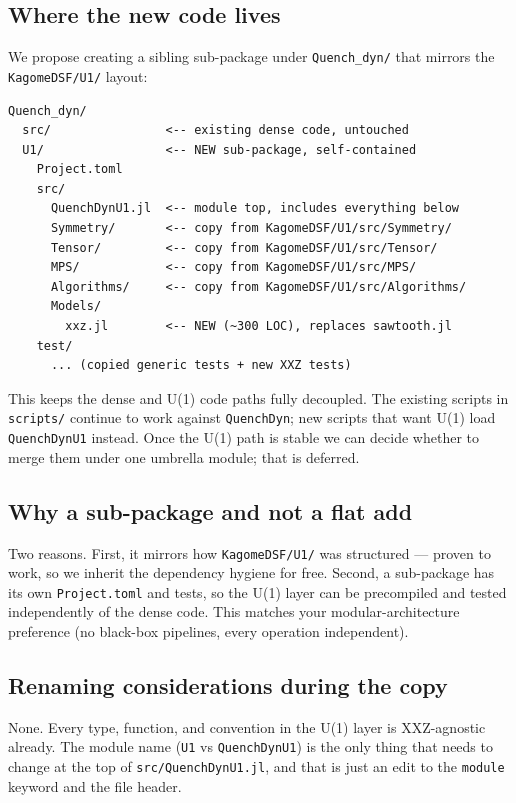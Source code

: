 \documentclass[11pt]{article}
\begin{document}
\subsection{Where the new code lives}
We propose creating a sibling sub-package under \texttt{Quench\_dyn/} that
mirrors the \texttt{KagomeDSF/U1/} layout:
\begin{verbatim}
Quench_dyn/
  src/                <-- existing dense code, untouched
  U1/                 <-- NEW sub-package, self-contained
    Project.toml
    src/
      QuenchDynU1.jl  <-- module top, includes everything below
      Symmetry/       <-- copy from KagomeDSF/U1/src/Symmetry/
      Tensor/         <-- copy from KagomeDSF/U1/src/Tensor/
      MPS/            <-- copy from KagomeDSF/U1/src/MPS/
      Algorithms/     <-- copy from KagomeDSF/U1/src/Algorithms/
      Models/
        xxz.jl        <-- NEW (~300 LOC), replaces sawtooth.jl
    test/
      ... (copied generic tests + new XXZ tests)
\end{verbatim}
This keeps the dense and U(1) code paths fully decoupled.  The existing
scripts in \texttt{scripts/} continue to work against \texttt{QuenchDyn}; new
scripts that want U(1) load \texttt{QuenchDynU1} instead.  Once the U(1)
path is stable we can decide whether to merge them under one umbrella module;
that is deferred.

\subsection{Why a sub-package and not a flat add}
Two reasons.  First, it mirrors how \texttt{KagomeDSF/U1/} was structured ---
proven to work, so we inherit the dependency hygiene for free.  Second, a
sub-package has its own \texttt{Project.toml} and tests, so the U(1) layer
can be precompiled and tested independently of the dense code.  This matches
your modular-architecture preference (no black-box pipelines, every
operation independent).

\subsection{Renaming considerations during the copy}
None.  Every type, function, and convention in the U(1) layer is XXZ-agnostic
already.  The module name (\texttt{U1} vs \texttt{QuenchDynU1}) is the only
thing that needs to change at the top of \texttt{src/QuenchDynU1.jl}, and
that is just an edit to the \texttt{module} keyword and the file header.

\end{document}
